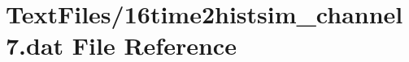 \hypertarget{16time2histsim__channel7_8dat}{}\section{Text\+Files/16time2histsim\+\_\+channel7.dat File Reference}
\label{16time2histsim__channel7_8dat}
